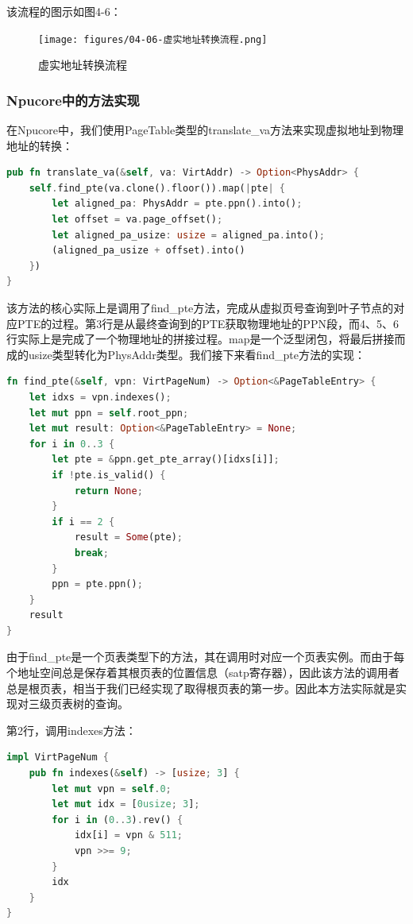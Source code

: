 该流程的图示如图4-6：

\begin{figure}[h]
	\centering
	\texttt{[image: figures/04-06-虚实地址转换流程.png]}
	\caption{虚实地址转换流程}
\end{figure}\FloatBarrier

\subsubsection{Npucore中的方法实现}

在Npucore中，我们使用PageTable类型的translate\_va方法来实现虚拟地址到物理地址的转换：

\begin{lstlisting}[language={Rust}, label={code:pte},
	caption={os/src/mm/page\_table.rs}]
pub fn translate_va(&self, va: VirtAddr) -> Option<PhysAddr> {
	self.find_pte(va.clone().floor()).map(|pte| {
		let aligned_pa: PhysAddr = pte.ppn().into();
		let offset = va.page_offset();
		let aligned_pa_usize: usize = aligned_pa.into();
		(aligned_pa_usize + offset).into()
	})
}
\end{lstlisting}

该方法的核心实际上是调用了find\_pte方法，完成从虚拟页号查询到叶子节点的对应PTE的过程。第3行是从最终查询到的PTE获取物理地址的PPN段，而4、5、6行实际上是完成了一个物理地址的拼接过程。map是一个泛型闭包，将最后拼接而成的usize类型转化为PhysAddr类型。我们接下来看find\_pte方法的实现：

\begin{lstlisting}[language={Rust}, label={code:pte},
	caption={os/src/mm/page\_table.rs}]
fn find_pte(&self, vpn: VirtPageNum) -> Option<&PageTableEntry> {
	let idxs = vpn.indexes();
	let mut ppn = self.root_ppn;
	let mut result: Option<&PageTableEntry> = None;
	for i in 0..3 {
		let pte = &ppn.get_pte_array()[idxs[i]];
		if !pte.is_valid() {
			return None;
		}
		if i == 2 {
			result = Some(pte);
			break;
		}
		ppn = pte.ppn();
	}
	result
}
\end{lstlisting}

由于find\_pte是一个页表类型下的方法，其在调用时对应一个页表实例。而由于每个地址空间总是保存着其根页表的位置信息（satp寄存器），因此该方法的调用者总是根页表，相当于我们已经实现了取得根页表的第一步。因此本方法实际就是实现对三级页表树的查询。

第2行，调用indexes方法：

\begin{lstlisting}[language={Rust}, label={code:pte},
	caption={os/src/mm/address.rs}]
impl VirtPageNum {
	pub fn indexes(&self) -> [usize; 3] {
		let mut vpn = self.0;
		let mut idx = [0usize; 3];
		for i in (0..3).rev() {
			idx[i] = vpn & 511;
			vpn >>= 9;
		}
		idx
	}
}
\end{lstlisting}

